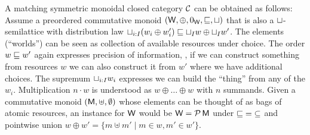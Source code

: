\documentclass[acmsmall,review,anonymous]{acmart}\settopmatter{printfolios=true,printccs=false,printacmref=false}
\theoremstyle{remark}
\begin{document}
A matching symmetric monoidal closed category $\mathcal{C}$ can be obtained as
follows:
%
Assume a preordered commutative monoid $(\mathsf{W},\oplus,0_{\mathsf{W}},\sqsubseteq,\sqcup)$
that is also a $\sqcup$-semilattice with distribution law $\sqcup_{i:I} (w_i \oplus w'_i) \sqsubseteq \sqcup_I w \oplus \sqcup_I w'$.  The elements (``worlds'') can be
seen as collection of available resources under choice.  The
order $w \sqsubseteq w'$ again expresses precision of information, \ie, if
we can construct something from resources $w$ we can also construct it
from $w'$ where we have additional choices.
The supremum $\sqcup_{i:I}w_i$ expresses we can build the
``thing'' from any of the $w_i$.  Multiplication $n \cdot w$ is
understood as $w \oplus \dots \oplus w$ with $n$ summands.
%
Given a commutative monoid $(\mathsf{M},\uplus,\emptyset)$ whose elements can
be thought of as bags of atomic resources, an instance for $\mathsf{W}$ would
be $\mathsf{W} = \mathcal{P}\,\mathsf{M}$ under ${\sqsubseteq} = {\subseteq}$ and pointwise union
$w \oplus w' = \{ m \uplus m' \mid m \in w, m' \in w' \}$.
\end{document}
